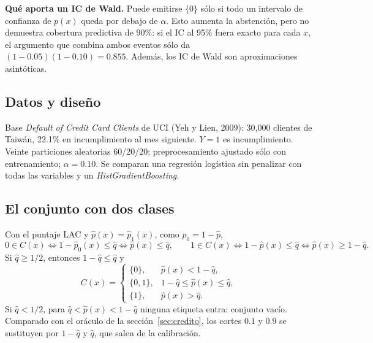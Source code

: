 \documentclass[11pt]{article}
\theoremstyle{plain}
\theoremstyle{definition}
\theoremstyle{remark}
\newcommand{\qhat}{\widehat q}
\newcommand{\phat}{\widehat p}
\newcommand{\dest}[1]{\par\needspace{4\baselineskip}\textbf{#1}\quad}
\begin{document}
\dest{Qué aporta un IC de Wald.} Puede emitirse $\{0\}$ sólo si todo un intervalo de confianza de
$p(x)$ queda por debajo de $\alpha$. Esto aumenta la abstención, pero no demuestra cobertura
predictiva de 90\%: si el IC al 95\% fuera exacto para cada $x$, el argumento que combina ambos
eventos sólo da $(1-0.05)(1-0.10)=0.855$. Además, los IC de Wald son aproximaciones asintóticas.

\subsection{Datos y diseño}
Base \emph{Default of Credit Card Clients} de UCI (Yeh y Lien, 2009): 30,000 clientes de Taiwán,
22.1\% en incumplimiento al mes siguiente. $Y=1$ es incumplimiento. Veinte particiones aleatorias
60/20/20; preprocesamiento ajustado sólo con entrenamiento; $\alpha=0.10$. Se comparan una
regresión logística sin penalizar con todas las variables y un \emph{HistGradientBoosting}.

\subsection{El conjunto con dos clases}
Con el puntaje LAC y $\phat(x)=\phat_1(x)$, como $\phat_0=1-\phat$,
\[
 0\in C(x)\iff1-\phat_0(x)\le\qhat\iff\phat(x)\le\qhat,\qquad
 1\in C(x)\iff1-\phat(x)\le\qhat\iff\phat(x)\ge1-\qhat .
\]
Si $\qhat\ge1/2$, entonces $1-\qhat\le\qhat$ y
\[
 C(x)=\begin{cases}\{0\},&\phat(x)<1-\qhat,\\\{0,1\},&1-\qhat\le\phat(x)\le\qhat,\\\{1\},&\phat(x)>\qhat.\end{cases}
\]
Si $\qhat<1/2$, para $\qhat<\phat(x)<1-\qhat$ ninguna etiqueta entra: conjunto vacío. Comparado con el
oráculo de la sección~\ref{sec:credito}, los cortes $0.1$ y $0.9$ se sustituyen por $1-\qhat$ y $\qhat$, que salen de
la calibración.
\end{document}
